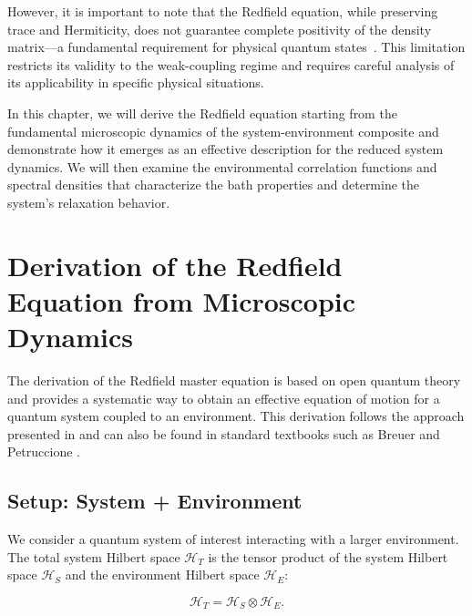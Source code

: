 However, it is important to note that the Redfield equation, while preserving trace and Hermiticity, does not guarantee complete positivity of the density matrix—a fundamental requirement for physical quantum states~\cite{rivasetal2010markovianmasterequations}. This limitation restricts its validity to the weak-coupling regime and requires careful analysis of its applicability in specific physical situations.

In this chapter, we will derive the Redfield equation starting from the fundamental microscopic dynamics of the system-environment composite and demonstrate how it emerges as an effective description for the reduced system dynamics. We will then examine the environmental correlation functions and spectral densities that characterize the bath properties and determine the system's relaxation behavior.


\section{Derivation of the Redfield Equation from Microscopic Dynamics}
\label{sec:Derivation_redfield_eq_from_microscopic_dynamics}

The derivation of the Redfield master equation is based on open quantum theory and provides a systematic way to obtain an effective equation of motion for a quantum system coupled to an environment. This derivation follows the approach presented in \cite{manzano2020shortintroductionlindblad} and can also be found in standard textbooks such as Breuer and Petruccione \cite{breuerpetruccione2009theoryopenquantum}.

\subsection{Setup: System + Environment}

We consider a quantum system of interest interacting with a larger environment. The total system Hilbert space $\mathcal{H}_T$ is the tensor product of the system Hilbert space $\mathcal{H}_S$ and the environment Hilbert space $\mathcal{H}_E$:

\begin{equation}
	\mathcal{H}_T = \mathcal{H}_S \otimes \mathcal{H}_E.
	\label{eq:Total_Hilbert_Space}
\end{equation}


